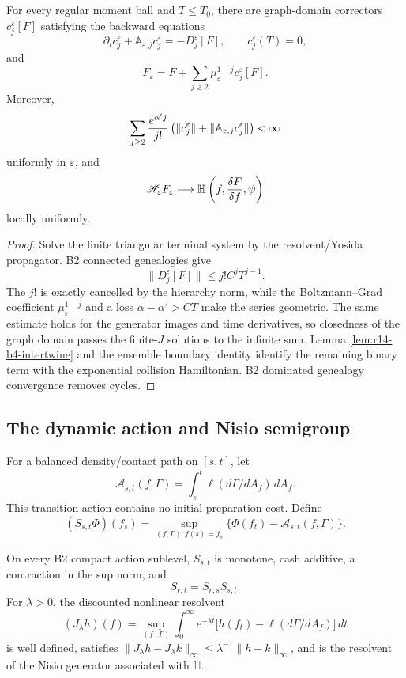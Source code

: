 \begin{theorem}
\label{thm:r14-b4-corrector}
For every regular moment ball and \(T\le T_0\), there are graph-domain
correctors \(c_j^\varepsilon[F]\) satisfying the backward equations
\[
 \partial_t c_j^\varepsilon
 +\mathbb A_{\varepsilon,j}c_j^\varepsilon
 =-D_j^\varepsilon[F],\qquad c_j^\varepsilon(T)=0,
\]
and
\[
 F_\varepsilon
 =F+\sum_{j\ge2}\mu_\varepsilon^{1-j}c_j^\varepsilon[F].
\]
Moreover,
\[
 \sum_{j\ge2}{e^{\alpha'j}\over j!}
 \left(
 \|c_j^\varepsilon\|+
 \|\mathbb A_{\varepsilon,j}c_j^\varepsilon\|
 \right)<\infty
\]
uniformly in \(\varepsilon\), and
\[
 \mathscr H_\varepsilon F_\varepsilon
 \longrightarrow
 \mathbb H\left(f,{\delta F\over\delta f},\psi\right)
\]
locally uniformly.
\end{theorem}

\begin{proof}
Solve the finite triangular terminal system by the resolvent/Yosida
propagator.  B2 connected genealogies give
\[
 \|D_j^\varepsilon[F]\|
 \le j!C^jT^{j-1}.
\]
The \(j!\) is exactly cancelled by the hierarchy norm, while the
Boltzmann--Grad coefficient \(\mu_\varepsilon^{1-j}\) and a loss
\(\alpha-\alpha'>CT\) make the series geometric.  The same estimate holds for
the generator images and time derivatives, so closedness of the graph domain
passes the finite-\(J\) solutions to the infinite sum.  Lemma
\ref{lem:r14-b4-intertwine} and the ensemble boundary identity identify the
remaining binary term with the exponential collision Hamiltonian.  B2
dominated genealogy convergence removes cycles.
\end{proof}

\subsection{The dynamic action and Nisio semigroup}

For a balanced density/contact path on \([s,t]\), let
\[
 \mathcal A_{s,t}(f,\Gamma)
 =\int_s^t\ell(d\Gamma/dA_f)\,dA_f .
\]
This transition action contains no initial preparation cost.  Define
\[
 (S_{s,t}\Phi)(f_s)
 =
 \sup_{(f,\Gamma):f(s)=f_s}
 \{\Phi(f_t)-\mathcal A_{s,t}(f,\Gamma)\}.
\]

\begin{theorem}
\label{thm:r14-b4-nisio}
On every B2 compact action sublevel,
\(S_{s,t}\) is monotone, cash additive, a contraction in the sup norm, and
\[
 S_{r,t}=S_{r,s}S_{s,t}.
\]
For \(\lambda>0\), the discounted nonlinear resolvent
\[
 (J_\lambda h)(f)
 =
 \sup_{(f_\cdot,\Gamma)}
 \int_0^\infty e^{-\lambda t}
 \bigl[h(f_t)-\ell(d\Gamma/dA_f)\bigr]\,dt
\]
is well defined, satisfies
\(\|J_\lambda h-J_\lambda k\|_\infty\le\lambda^{-1}\|h-k\|_\infty\), and is
the resolvent of the Nisio generator associated with \(\mathbb H\).
\end{theorem}

